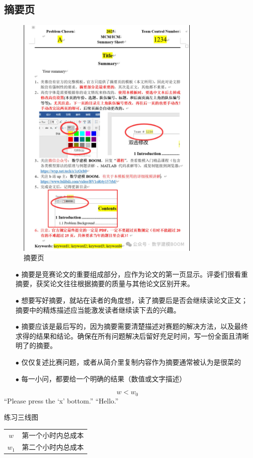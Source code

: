 \documentclass[12pt]{article}
\begin{document}
		\subsection{摘要页}
			\begin{figure}[htbp]
				\centering
				\includegraphics[width=0.8\textwidth]{2}
				\caption{摘要页}
				\label{fig:2}
			\end{figure}
			\begin{itemize}
				\item[$\bullet$] 摘要是竞赛论文的重要组成部分，应作为论文的第一页显示。评委们很看重摘要，获奖论文往往根据摘要的质量与其他论文区别开来。
				\item[$\bullet$] 想要写好摘要，就站在读者的角度想，读了摘要后是否会继续读论文正文；摘要中的精炼描述应当能激发读者继续读下去的兴趣。
				\item[$\bullet$]摘要应该是最后写的，因为摘要需要清楚描述对赛题的解决方法，以及最终求得的结果和结论。确保在所有问题解决后留好充足时间，写一份全面且清晰明了的摘要。 
				\item[$\bullet$] 仅仅复述比赛问题，或者从简介里复制内容作为摘要通常被认为是很菜的
				\item[$\bullet$] 每一小问，都要给一个明确的结果（数值或文字描述）
			\end{itemize}
			$$w < w_0$$
			``Please press the `x' bottom.''
			``Hello.''
			\begin{center}
			练习三线图 \\
			\begin{tabular}{cc}
				\toprule[1.5pt]
				\makebox[0.3\textwidth][c]{符号} & \makebox[0.4\textwidth][c]{意义} \\
				\midrule[1pt]
				$ w $	& 第一个小时内总成本	\\
				$ w_1 $	& 第二个小时内总成本	\\
				\bottomrule[1.5pt]
			\end{tabular}
			\end{center}
			
\end{document}
